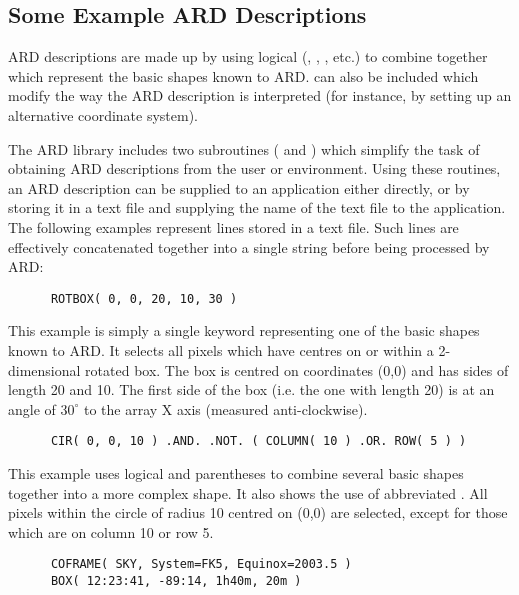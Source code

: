 \subsection{Some Example ARD Descriptions}
ARD descriptions are made up by using logical  
(, , ,
etc.) to combine together  which represent the basic shapes known to ARD.
 can also be included which modify the way the ARD description is
interpreted (for instance, by setting up an alternative coordinate system). 

The ARD library includes two subroutines ( and ) which
simplify the task of obtaining ARD descriptions from the user or environment.
Using these routines, an ARD description can be supplied to an application
either directly, or by storing it in a text file and supplying the name of the
text file to the application. The following examples represent lines stored in a
text file. Such lines are effectively concatenated together into a single string
before being processed by ARD: 

\small
\begin{verbatim}
      ROTBOX( 0, 0, 20, 10, 30 )
\end{verbatim}
\normalsize

This example is simply a single keyword representing one of the basic shapes
known to ARD. It selects all pixels which have centres on or within a
2-dimensional rotated box. The box is centred on coordinates (0,0) and has
sides of length 20 and 10. The first side of the box (i.e. the one with length 
20) is at an angle of $30^{\circ}$ \hspace{1mm} to the array X axis (measured 
anti-clockwise). 

\small
\begin{verbatim}
      CIR( 0, 0, 10 ) .AND. .NOT. ( COLUMN( 10 ) .OR. ROW( 5 ) )
\end{verbatim}
\normalsize

This example uses logical  and parentheses to combine several basic
shapes together into a more complex shape. It also shows the use of abbreviated
. All pixels within the circle of radius 10 centred on (0,0) are
selected, except for those which are on column 10 or row 5. 

\small
\begin{verbatim}
      COFRAME( SKY, System=FK5, Equinox=2003.5 )
      BOX( 12:23:41, -89:14, 1h40m, 20m ) 
\end{verbatim}
\normalsize

